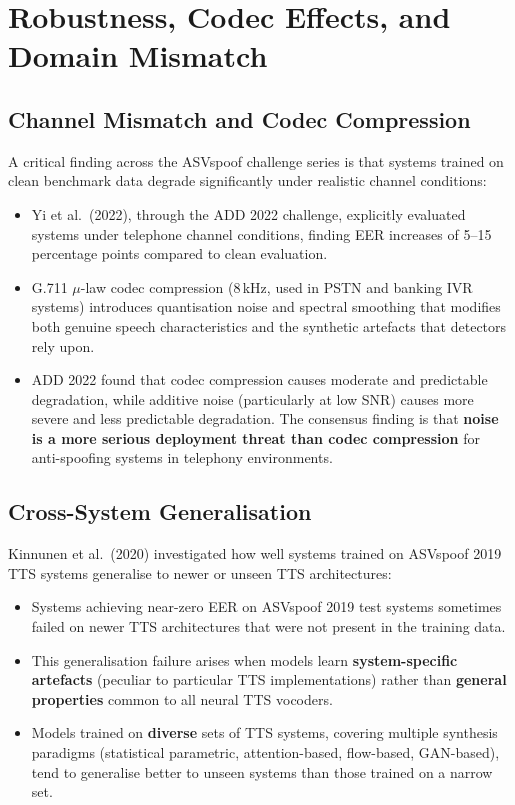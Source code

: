 \documentclass[12pt,a4paper]{article}
\begin{document}
\section{Robustness, Codec Effects, and Domain Mismatch}

\subsection{Channel Mismatch and Codec Compression}

A critical finding across the ASVspoof challenge series is that systems trained on clean
benchmark data degrade significantly under realistic channel conditions:

\begin{itemize}
  \item Yi et al.\ (2022), through the ADD 2022 challenge, explicitly evaluated systems
    under telephone channel conditions, finding EER increases of 5--15 percentage points
    compared to clean evaluation.
  \item G.711 $\mu$-law codec compression (8\,kHz, used in PSTN and banking IVR systems)
    introduces quantisation noise and spectral smoothing that modifies both genuine speech
    characteristics and the synthetic artefacts that detectors rely upon.
  \item ADD 2022 found that codec compression causes moderate and predictable degradation,
    while additive noise (particularly at low SNR) causes more severe and less predictable
    degradation. The consensus finding is that \textbf{noise is a more serious deployment
    threat than codec compression} for anti-spoofing systems in telephony environments.
\end{itemize}

\subsection{Cross-System Generalisation}

Kinnunen et al.\ (2020) investigated how well systems trained on ASVspoof 2019 TTS
systems generalise to newer or unseen TTS architectures:

\begin{itemize}
  \item Systems achieving near-zero EER on ASVspoof 2019 test systems sometimes failed
    on newer TTS architectures that were not present in the training data.
  \item This generalisation failure arises when models learn \textbf{system-specific
    artefacts} (peculiar to particular TTS implementations) rather than \textbf{general
    properties} common to all neural TTS vocoders.
  \item Models trained on \textbf{diverse} sets of TTS systems, covering multiple
    synthesis paradigms (statistical parametric, attention-based, flow-based, GAN-based),
    tend to generalise better to unseen systems than those trained on a narrow set.
\end{itemize}
\end{document}
